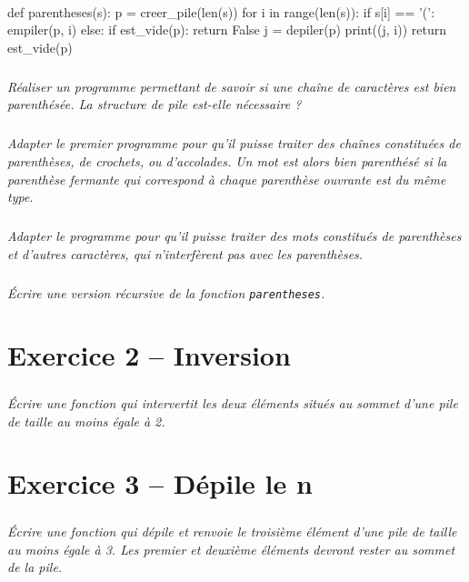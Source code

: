 \documentclass[10pt,fleqn]{article} %
\begin{document}
\begin{multicols}{2}
\ifprof
\begin{corrige}
~\\
\begin{python}
def parentheses(s):
    p = creer_pile(len(s))
    for i in range(len(s)):
    if s[i] == '(':
        empiler(p, i)
    else:
        if est_vide(p):
            return False
        j = depiler(p)
        print((j, i))
    return est_vide(p)
\end{python}
\end{corrige}
\else
\fi

\subparagraph{}
\textit{Réaliser un programme permettant de savoir si une chaîne de caractères est bien parenthésée. La structure de pile est-elle nécessaire ?}
\ifprof
\begin{corrige}
\end{corrige}
\else
\fi


\subparagraph{}
\textit{Adapter le premier programme pour qu'il puisse traiter des chaînes constituées de parenthèses, de crochets, ou d'accolades. Un mot est alors bien parenthésé si la parenthèse fermante qui correspond à chaque parenthèse ouvrante est du même type.}
\ifprof
\begin{corrige}
\end{corrige}
\else
\fi

\subparagraph{}
\textit{Adapter le programme pour qu’il puisse traiter des mots constitués de parenthèses et
d’autres caractères, qui n’interfèrent pas avec les parenthèses.}
\ifprof
\begin{corrige}
\end{corrige}
\else
\fi


\subparagraph{}
\textit{Écrire une version récursive de la fonction \texttt{parentheses}.}
\ifprof
\begin{corrige}
\end{corrige}
\else
\fi


\section*{Exercice 2 -- Inversion}
\subparagraph*{}
\setcounter{exo}{0}
\textit{Écrire une fonction qui intervertit les deux éléments situés au sommet d’une pile de taille
au moins égale à 2.}
\ifprof
\begin{corrige}
\end{corrige}
\else
\fi


\section*{Exercice 3 -- Dépile le n\ieme}
\setcounter{exo}{0}
\subparagraph*{}
\textit{Écrire une fonction qui dépile et renvoie le troisième élément d’une pile de taille au moins
égale à 3. Les premier et deuxième éléments devront rester au sommet de la pile.}
\ifprof
\begin{corrige}
\end{corrige}
\else
\fi


\end{multicols}
\end{document}
